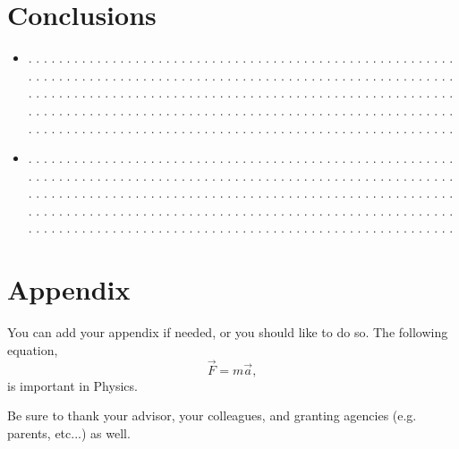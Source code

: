 \documentclass[twocolumn]{revtex4}
\begin{document}
\section{Conclusions}
\begin{itemize}

\item
. . . . . . . . . . . . . . . . . . . . . . . . . . . . . . . . . . . . . . . .
. . . . . . . . . . . . . . . . . . . . . . . . . . . . . . . . . . . . . . . .
. . . . . . . . . . . . . . . . . . . . . . . . . . . . . . . . . . . . . . . .
. . . . . . . . . . . . . . . . . . . . . . . . . . . . . . . . . . . . . . . .
. . . . . . . . . . . . . . . . . . . . . . . . . . . . . . . . . . . . . . . .
. . . . . . . . . . . . . . . . . . . . . . . . . . . . . . . . . . . . . . . .
. . . . . . . . . . . . . . . . . . . . . . . . . . . . . . . . . . . . . . . .

\item
. . . . . . . . . . . . . . . . . . . . . . . . . . . . . . . . . . . . . . . .
. . . . . . . . . . . . . . . . . . . . . . . . . . . . . . . . . . . . . . . .
. . . . . . . . . . . . . . . . . . . . . . . . . . . . . . . . . . . . . . . .
. . . . . . . . . . . . . . . . . . . . . . . . . . . . . . . . . . . . . . . .
. . . . . . . . . . . . . . . . . . . . . . . . . . . . . . . . . . . . . . . .
. . . . . . . . . . . . . . . . . . . . . . . . . . . . . . . . . . . . . . . .
. . . . . . . . . . . . . . . . . . . . . . . . . . . . . . . . . . . . . . . .
\end{itemize}


\section{Appendix}
You can add your appendix if needed, or you should like
to do so. The following equation,
\begin{equation}
\vec{F}= m \vec{a},
\label{newton}
\end{equation}
is important in Physics.

\vspace*{0.5cm}
\begin{acknowledgments}
Be sure to thank your advisor,
your colleagues, and granting agencies (e.g. parents, etc...) as well.
\end{acknowledgments}
\end{document}

